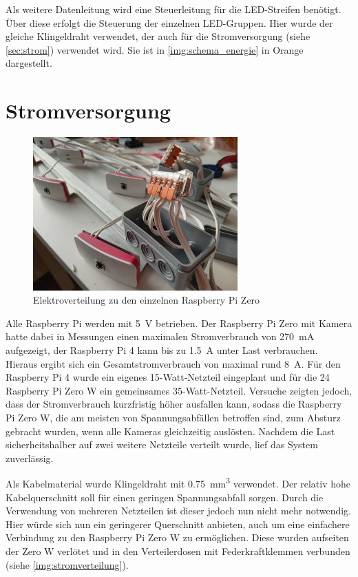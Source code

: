 \documentclass[./00PhotoBox.tex]{subfiles}
\begin{document}
Als weitere Datenleitung wird eine Steuerleitung für die LED-Streifen benötigt. Über diese erfolgt die Steuerung der einzelnen LED-Gruppen. Hier wurde der gleiche Klingeldraht verwendet, der auch für die Stromversorgung (siehe \autoref{sec:strom}) verwendet wird. Sie ist in \autoref{img:schema_energie} in Orange dargestellt.


\section{Stromversorgung}
\label{sec:strom}

\begin{figure}
    \centering
    \includegraphics[width=0.7\textwidth]{./img/3_aufbau/stromverteilung.jpg}
    \caption{Elektroverteilung zu den einzelnen Raspberry Pi Zero}
    \label{img:stromverteilung}
\end{figure}

Alle Raspberry Pi werden mit \SI{5}{\volt} betrieben. Der Raspberry Pi Zero mit Kamera hatte dabei in Messungen einen maximalen Stromverbrauch von \SI{270}{\milli\ampere} aufgezeigt, der Raspberry Pi 4 kann bis zu \SI{1,5}{\ampere} unter Last verbrauchen. Hieraus ergibt sich ein Gesamtstromverbrauch von maximal rund \SI{8}{\ampere}. Für den Raspberry Pi 4 wurde ein eigenes 15-Watt-Netzteil eingeplant und für die 24 Raspberry Pi Zero W ein gemeinsames 35-Watt-Netzteil. Versuche zeigten jedoch, dass der Stromverbrauch kurzfristig höher ausfallen kann, sodass die Raspberry Pi Zero W, die am meisten von Spannungsabfällen betroffen sind, zum Absturz gebracht wurden, wenn alle Kameras gleichzeitig auslösten. Nachdem die Last sicherheitshalber auf zwei weitere Netzteile verteilt wurde, lief das System zuverlässig.

Als Kabelmaterial wurde Klingeldraht mit \SI{0,75}{\cubic\milli\metre} verwendet. Der relativ hohe Kabelquerschnitt soll für einen geringen Spannungsabfall sorgen. Durch die Verwendung von mehreren Netzteilen ist dieser jedoch nun nicht mehr notwendig. Hier würde sich nun ein geringerer Querschnitt anbieten, auch um eine einfachere Verbindung zu den Raspberry Pi Zero W zu ermöglichen. Diese wurden aufseiten der Zero W verlötet und in den Verteilerdosen mit Federkraftklemmen verbunden (siehe \autoref{img:stromverteilung}).
\end{document}
